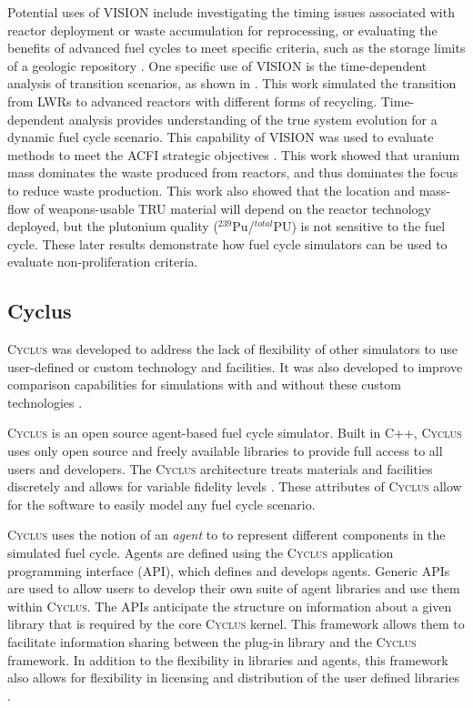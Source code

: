 \documentclass{article}
\newcommand{\Cyclus}{\textsc{Cyclus}\xspace}%
\begin{document}
    Potential uses of \gls{VISION} include investigating the timing issues 
    associated with reactor deployment or waste accumulation for reprocessing, 
    or evaluating the benefits of advanced fuel cycles to meet specific 
    criteria, such as the storage limits of a geologic repository 
    \cite{yacout_visionverifiable_2006}. One specific use of \gls{VISION}
    is the time-dependent analysis of transition scenarios, as shown in 
    \cite{piet_dynamic_2011}. This work 
    simulated the transition from \glspl{LWR} to advanced reactors with different 
    forms of recycling. Time-dependent analysis provides understanding of the 
    true system evolution for a dynamic fuel cycle scenario. This capability of 
    \gls{VISION} was used to evaluate methods to meet the ACFI strategic 
    objectives \cite{piet_dynamic_2011}. This work showed that uranium mass 
    dominates the waste produced from reactors, and thus dominates the focus
    to reduce waste production. This work also showed that the location and 
    mass-flow of weapons-usable \gls{TRU} material will depend on the 
    reactor technology deployed, but the plutonium quality 
    ($^{239}$Pu/$^{total}$PU) is not sensitive to the fuel cycle. These later
    results demonstrate how fuel cycle simulators can be used to evaluate 
    non-proliferation criteria. 

\subsection{Cyclus}
    \Cyclus was developed to address the lack of flexibility of other 
    simulators to use user-defined or custom technology and facilities. It 
    was also developed to improve comparison capabilities for simulations 
    with and without these custom technologies \cite{huff_fundamental_2016}.

    \Cyclus is an open source agent-based fuel cycle simulator. Built 
    in C++, \Cyclus uses only open source and freely available libraries to 
    provide full access to all users and developers. The 
    \Cyclus architecture treats materials and facilities discretely and allows 
    for variable fidelity levels \cite{huff_fundamental_2016}. These attributes
    of \Cyclus allow for the software to easily model any fuel cycle scenario.

    \Cyclus uses the notion of an \textit{agent} to to represent different 
    components in the simulated fuel cycle. Agents are 
    defined using the \Cyclus application programming interface (API), which 
    defines and develops agents. Generic APIs are used to allow users 
    to develop their own suite of agent libraries and use them within \Cyclus. 
    The APIs anticipate the structure on information about a given library 
    that is required by the core \Cyclus kernel. This framework allows them 
    to facilitate 
    information sharing between the plug-in library and the \Cyclus framework. 
    In addition to the flexibility in libraries and agents, this framework 
    also allows for flexibility in licensing and distribution of the user 
    defined libraries \cite{huff_fundamental_2016}.
\end{document}
